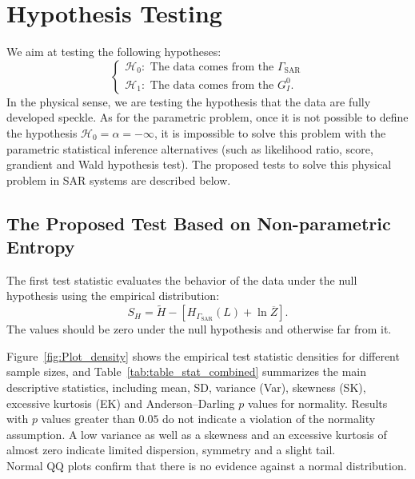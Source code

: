 \documentclass[remotesensing,article,submit,moreauthors,pdftex]{Definitions/mdpi}
\begin{document}
\hypertarget{sec:test}{%
\section{Hypothesis Testing}\label{sec:test}}

We aim at testing the following hypotheses:
\[
 \begin{cases}\mathcal{H}_0: \text{ The data comes from the } \Gamma_{\text{SAR}}\\ 
  \mathcal{H}_1:\text{ The data comes from the } G_I^0.\end{cases}
\] 
In the physical sense, we are testing the hypothesis that the data are fully developed speckle.
As for the parametric problem, once it is not possible to define the hypothesis $\mathcal{H}_0=\alpha=-\infty$, it is impossible to solve this problem with the parametric statistical inference alternatives (such as likelihood ratio, score, grandient and Wald hypothesis test).
The proposed tests to solve this physical problem in SAR systems are described below.

\hypertarget{the-proposed-test-based-on-non-parametric-entropy}{%
\subsection{The Proposed Test Based on Non-parametric
Entropy}\label{the-proposed-test-based-on-non-parametric-entropy}}

The first test statistic evaluates the behavior of the data under the null hypothesis using the empirical distribution: 
\begin{equation}\label{Eq:test_e}
S_H= \widetilde{H}-\left[H_{\Gamma_{\text{SAR}}}(L)+\ln \overline{Z}\right].
\end{equation} 
The values should be zero under the null hypothesis and otherwise far from it.

Figure~\ref{fig:Plot_density} shows the empirical test statistic densities for different sample sizes, and Table~\ref{tab:table_stat_combined}
summarizes the main descriptive statistics, including mean, SD, variance (Var), skewness
(SK), excessive kurtosis (EK) and Anderson--Darling \(p\) values for normality. Results with \(p\) values greater than \(0.05\) do not indicate a violation of the normality assumption. A low variance as well as a skewness and an excessive kurtosis of almost zero indicate limited dispersion, symmetry and a slight tail.\\
Normal QQ plots confirm that there is no evidence against a normal distribution.
\end{document}
